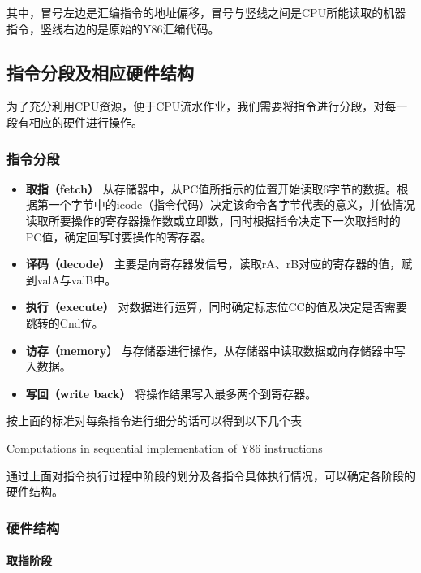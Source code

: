 \documentclass[12pt]{article}
\begin{document}
\begin{CJK*}{GB}{gbsn}
其中，冒号左边是汇编指令的地址偏移，冒号与竖线之间是CPU所能读取的机器指令，竖线右边的是原始的Y86汇编代码。

\subsection{指令分段及相应硬件结构}\label{ux6307ux4ee4ux5206ux6bb5ux53caux76f8ux5e94ux786cux4ef6ux7ed3ux6784}

为了充分利用CPU资源，便于CPU流水作业，我们需要将指令进行分段，对每一段有相应的硬件进行操作。

\subsubsection{指令分段}\label{ux6307ux4ee4ux5206ux6bb5}

\begin{itemize}
\item
  \textbf{取指（fetch）}
  从存储器中，从PC值所指示的位置开始读取6字节的数据。根据第一个字节中的icode（指令代码）决定该命令各字节代表的意义，并依情况读取所要操作的寄存器操作数或立即数，同时根据指令决定下一次取指时的PC值，确定回写时要操作的寄存器。
\item
  \textbf{译码（decode）}
  主要是向寄存器发信号，读取rA、rB对应的寄存器的值，赋到valA与valB中。
\item
  \textbf{执行（execute）}
  对数据进行运算，同时确定标志位CC的值及决定是否需要跳转的Cnd位。
\item
  \textbf{访存（memory）}
  与存储器进行操作，从存储器中读取数据或向存储器中写入数据。
\item
  \textbf{写回（write back）} 将操作结果写入最多两个到寄存器。
\end{itemize}

按上面的标准对每条指令进行细分的话可以得到以下几个表

Computations in sequential implementation of Y86 instructions

通过上面对指令执行过程中阶段的划分及各指令具体执行情况，可以确定各阶段的硬件结构。

\subsubsection{硬件结构}\label{ux786cux4ef6ux7ed3ux6784}

\paragraph{取指阶段}\label{ux53d6ux6307ux9636ux6bb5}


\end{CJK*}
\end{document}
